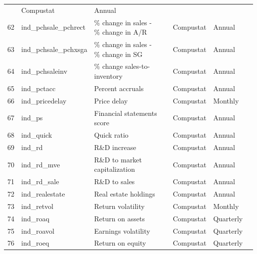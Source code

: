 \documentclass[11pt, a4paper, table]{article}
\begin{document}
\begin{landscape}
\begin{center}
\begin{longtable}{lllllll}
				\cite{abarbanell_abnormal_1998} & Compustat & Annual \\
			62 & ind\_pchsale\_pchrect\footnotemark[\value{footnote}] & \% change in sales - \% change in A/R & 
				\cite{abarbanell_abnormal_1998} & Compustat & Annual \\
			63 & ind\_pchsale\_pchxsga\footnotemark[\value{footnote}] & \% change in sales - \% change in SG & 
				\cite{abarbanell_abnormal_1998} & Compustat & Annual \\
			64 & ind\_pchsaleinv\footnotemark[\value{footnote}] & \% change sales-to-inventory & 
				\cite{ou_financial_1989} & Compustat & Annual \\
			65 & ind\_pctacc\footnotemark[\value{footnote}] & Percent accruals & 
				\cite{hafzalla_percent_2011} & Compustat & Annual \\
			66 & ind\_pricedelay & Price delay & 
				\cite{hou_market_2005} & Compustat & Monthly \\
			67 & ind\_ps & Financial statements score & 
				\cite{piotroski_value_2000} & Compustat & Annual \\
			68 & ind\_quick & Quick ratio & 
				\cite{ou_financial_1989} & Compustat & Annual \\
			69 & ind\_rd & R\&D increase & 
				\cite{eberhart_examination_2004} & Compustat & Annual \\
			70 & ind\_rd\_mve\footnotemark[\value{footnote}] & R\&D to market capitalization & 
				\cite{guo_explaining_2006} & Compustat & Annual \\
			71 & ind\_rd\_sale\footnotemark[\value{footnote}] & R\&D to sales & 
				\cite{guo_explaining_2006} & Compustat & Annual \\
			72 & ind\_realestate\footnotemark[\value{footnote}] & Real estate holdings & 
				\cite{tuzel_corporate_2010} & Compustat & Annual \\
			73 & ind\_retvol & Return volatility & 
				\cite{ang_cross-section_2006} & Compustat & Monthly \\
			74 & ind\_roaq & Return on assets & 
				\cite{balakrishnan_post_2010} & Compustat & Quarterly \\
			75 & ind\_roavol\footnotemark[\value{footnote}] & Earnings volatility & 
				\cite{francis_costs_2004} & Compustat & Quarterly \\
			76 & ind\_roeq & Return on equity & 
				\cite{hou_digesting_2015} & Compustat & Quarterly \\

\end{longtable}
\end{center}
\end{landscape}
\end{document}
